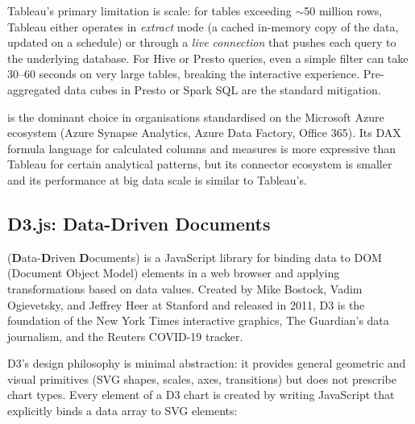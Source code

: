 Tableau's primary limitation is scale: for tables exceeding
$\sim$50 million rows, Tableau either operates in \emph{extract} mode
(a cached in-memory copy of the data, updated on a schedule) or through
a \emph{live connection} that pushes each query to the underlying database.
For Hive or Presto queries, even a simple filter can take 30--60 seconds
on very large tables, breaking the interactive experience. Pre-aggregated
data cubes in Presto or Spark SQL are the standard mitigation.

 is the dominant choice in organisations
standardised on the Microsoft Azure ecosystem (Azure Synapse Analytics,
Azure Data Factory, Office 365). Its DAX formula language for calculated
columns and measures is more expressive than Tableau for certain
analytical patterns, but its connector ecosystem is smaller and its
performance at big data scale is similar to Tableau's.

\subsection{D3.js: Data-Driven Documents}
\label{subsec:d3}

 (\textbf{D}ata-\textbf{D}riven \textbf{D}ocuments) is a
JavaScript library for binding data to DOM (Document Object Model)
elements in a web browser and applying transformations based on data
values. Created by Mike Bostock, Vadim Ogievetsky, and Jeffrey Heer at
Stanford and released in 2011, D3 is the foundation of the New York Times
interactive graphics, The Guardian's data journalism, and the Reuters
COVID-19 tracker.

D3's design philosophy is minimal abstraction: it provides general
geometric and visual primitives (SVG shapes, scales, axes, transitions)
but does not prescribe chart types. Every element of a D3 chart is
created by writing JavaScript that explicitly binds a data array to
SVG elements:

